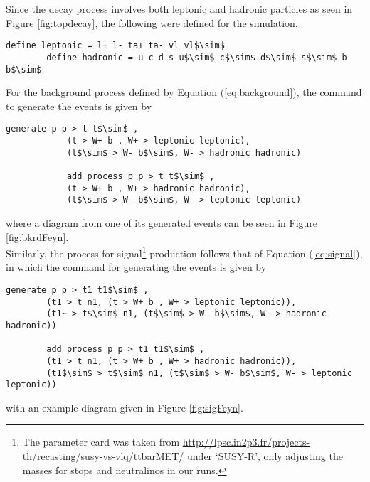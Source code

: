Since the decay process involves both leptonic and hadronic particles as seen in Figure \ref{fig:topdecay}, the following were defined for the simulation. \\

\begin{lstlisting}[mathescape = true]
        define leptonic = l+ l- ta+ ta- vl vl$\sim$
        define hadronic = u c d s u$\sim$ c$\sim$ d$\sim$ s$\sim$ b b$\sim$
\end{lstlisting}

For the background process defined by Equation (\ref{eq:background}), the command to generate the events is given by
\begin{lstlisting}[mathescape = true]
            generate p p > t t$\sim$ , 
            (t > W+ b , W+ > leptonic leptonic), 
            (t$\sim$ > W- b$\sim$, W- > hadronic hadronic)
        
            add process p p > t t$\sim$ ,
            (t > W+ b , W+ > hadronic hadronic), 
            (t$\sim$ > W- b$\sim$, W- > leptonic leptonic)
\end{lstlisting}
where a diagram from one of its generated events can be seen in Figure \ref{fig:bkrdFeyn}. \\

Similarly, the process for signal\footnote{The parameter card was taken from \url{http://lpsc.in2p3.fr/projects-th/recasting/susy-vs-vlq/ttbarMET/} \cite{kraml2016scalar} under `SUSY-R', only adjusting the masses for stops and neutralinos in our runs.} production follows that of Equation (\ref{eq:signal}), in which the command for generating the events is given by
\begin{lstlisting}[mathescape = true]
        generate p p > t1 t1$\sim$ ,
        (t1 > t n1, (t > W+ b , W+ > leptonic leptonic)),
        (t1~ > t$\sim$ n1, (t$\sim$ > W- b$\sim$, W- > hadronic hadronic))
        
        add process p p > t1 t1$\sim$ , 
        (t1 > t n1, (t > W+ b , W+ > hadronic hadronic)), 
        (t1$\sim$ > t$\sim$ n1, (t$\sim$ > W- b$\sim$, W- > leptonic leptonic))
\end{lstlisting}
with an example diagram given in Figure \ref{fig:sigFeyn}. \\

